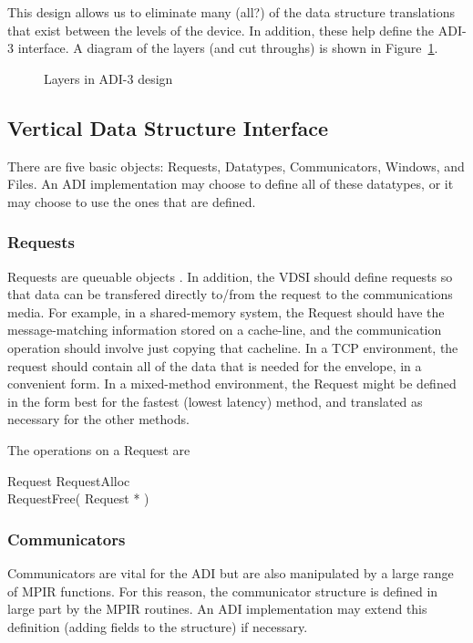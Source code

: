 \documentclass{article}
\let\note=\marginpar
\begin{document}
This design allows us to eliminate many (all?) of the data structure
translations 
that exist between the levels of the device.  In addition, these help define
the ADI-3 interface.  A diagram of the layers (and cut throughs) is shown in
Figure~\ref{fig:layers}.

\begin{figure}
\centerline{}
\caption{Layers in ADI-3 design}
\label{fig:layers}
\end{figure}

\subsection{Vertical Data Structure Interface}
There are five basic objects: Requests, Datatypes, Communicators, Windows, and
Files.  An ADI implementation may choose to define all of these datatypes, or
it may choose to use the ones that are defined.  

\subsubsection{Requests}
Requests are queuable objects \note{should everything be queueable?}.  In
addition, the VDSI should define requests so that data can be transfered
directly to/from the request to the communications media.  For example, in a
shared-memory system, the Request should have the message-matching information
stored on a cache-line, and the communication operation should involve just
copying that cacheline.  In a TCP environment, the request should contain all
of the data that is needed for the envelope, in a convenient form.  In a
mixed-method environment, the Request might be defined in the form best for
the fastest (lowest latency) method, and translated as necessary for the other
methods.  

The operations on a Request are
\begin{description}
\item[Request RequestAlloc]
\item[RequestFree( Request * )]
\end{description}

\subsubsection{Communicators}
Communicators are vital for the ADI but are also manipulated by a large range
of MPIR functions.  For this reason, the communicator structure is defined in
large part by the MPIR routines.  An ADI implementation may extend this
definition (adding fields to the structure) if necessary.
\end{document}
